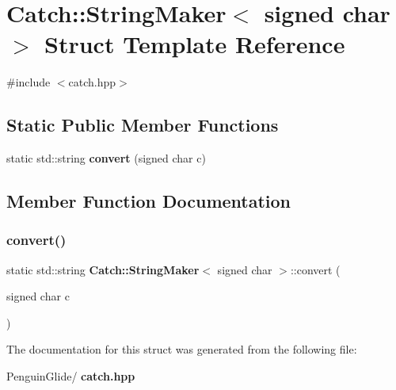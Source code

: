 \section{Catch\+::String\+Maker$<$ signed char $>$ Struct Template Reference}
\label{struct_catch_1_1_string_maker_3_01signed_01char_01_4}


{\ttfamily \#include $<$catch.\+hpp$>$}

\subsection*{Static Public Member Functions}
\begin{DoxyCompactItemize}
\item 
static std\+::string \textbf{ convert} (signed char c)
\end{DoxyCompactItemize}


\subsection{Member Function Documentation}
\mbox{\label{struct_catch_1_1_string_maker_3_01signed_01char_01_4_a5ec41f32916539dc90130539db8222cf}} 
\subsubsection{convert()}
{\footnotesize\ttfamily static std\+::string \textbf{ Catch\+::\+String\+Maker}$<$ signed char $>$\+::convert (\begin{DoxyParamCaption}\item[{signed char}]{c }\end{DoxyParamCaption})\hspace{0.3cm}{\ttfamily [static]}}



The documentation for this struct was generated from the following file\+:\begin{DoxyCompactItemize}
\item 
Penguin\+Glide/\textbf{ catch.\+hpp}\end{DoxyCompactItemize}
